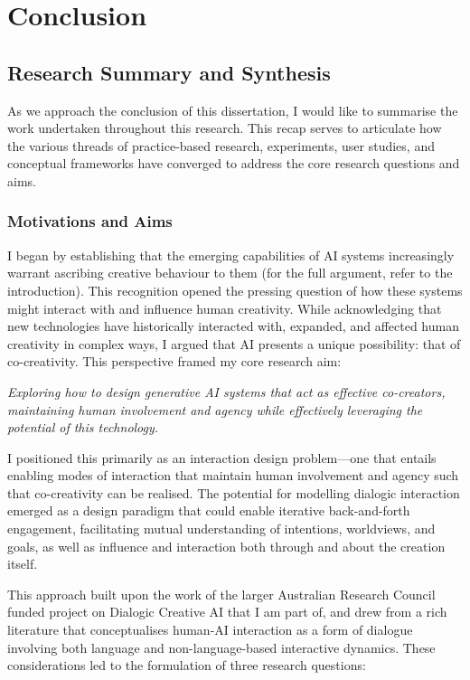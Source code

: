 \chapter{Conclusion}\label{c:conclusion}


\section{Research Summary and Synthesis}

As we approach the conclusion of this dissertation, I would like to summarise the work undertaken throughout this research. This recap serves to articulate how the various threads of practice-based research, experiments, user studies, and conceptual frameworks have converged to address the core research questions and aims.

\subsection{Motivations and Aims}

I began by establishing that the emerging capabilities of AI systems increasingly warrant ascribing creative behaviour to them (for the full argument, refer to the introduction). This recognition opened the pressing question of how these systems might interact with and influence human creativity. While acknowledging that new technologies have historically interacted with, expanded, and affected human creativity in complex ways, I argued that AI presents a unique possibility: that of co-creativity. This perspective framed my core research aim:

\textit{Exploring how to design generative AI systems that act as effective co-creators, maintaining human involvement and agency while effectively leveraging the potential of this technology.}

I positioned this primarily as an interaction design problem—one that entails enabling modes of interaction that maintain human involvement and agency such that co-creativity can be realised. The potential for modelling dialogic interaction emerged as a design paradigm that could enable iterative back-and-forth engagement, facilitating mutual understanding of intentions, worldviews, and goals, as well as influence and interaction both through and about the creation itself.

This approach built upon the work of the larger Australian Research Council funded project on Dialogic Creative AI that I am part of, and drew from a rich literature that conceptualises human-AI interaction as a form of dialogue involving both language and non-language-based interactive dynamics. These considerations led to the formulation of three research questions:

